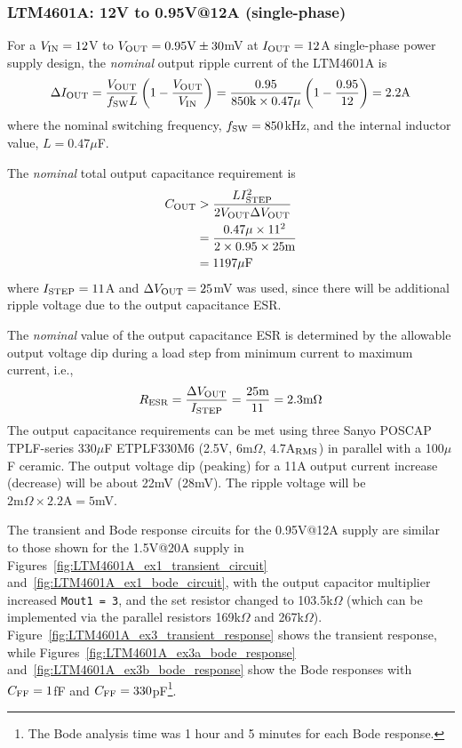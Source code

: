 \clearpage
\subsubsection{LTM4601A: 12V to 0.95V@12A (single-phase)}

For a $V_{\rm IN} = 12$V to $V_{\rm OUT} = 0.95\text{V} \pm 30$mV at 
$I_{\rm OUT} = 12$A single-phase power supply design, the
{\em nominal} output ripple current of the LTM4601A is
%
\begin{equation}
\Delta I_{\rm OUT} = \frac{V_{\rm OUT}}{f_{\rm SW}L}\left(
1 - \frac{V_{\rm OUT}}{V_{\rm IN}}\right) =
\frac{0.95}{850\text{k}\times0.47\mu}\left(
1 - \frac{0.95}{12}\right) = 2.2\text{A}
\end{equation}
%
where the nominal switching frequency, $f_{\rm SW} = 850$kHz, and
the internal inductor value, $L = 0.47\mu$F.

The {\em nominal} total output capacitance requirement is
%
\begin{equation}
\begin{split}
C_{\rm OUT} &> \frac{LI_{\rm STEP}^2}{2V_{\rm OUT}\Delta V_{\rm OUT}}\\
&= \frac{0.47\mu\times 11^2}{2\times0.95\times25\text{m}}\\
&= 1197\mu\text{F}
\end{split}
\end{equation}
%
%
where $I_{\rm STEP}=11$A and $\Delta V_{\rm OUT} = 25$mV was
used, since there will be additional ripple voltage due to 
the output capacitance ESR.

The {\em nominal} value of the output capacitance ESR is determined by
the allowable output voltage dip during a load step from minimum current
to maximum current, i.e.,
%
\begin{equation}
R_{\rm ESR} = \frac{\Delta V_{\rm OUT}}{I_{\rm STEP}} = 
\frac{25\text{m}}{11} = 2.3\text{m}\Omega
\end{equation}
%
The output capacitance requirements can be met using three
Sanyo POSCAP TPLF-series
330$\mu$F ETPLF330M6 (2.5V, 6m$\Omega$, 4.7A$_{\rm RMS}$)
in parallel with a 100$\mu$F ceramic.
%
The output voltage dip (peaking) for a 11A output current increase
(decrease) will be about 22mV (28mV). The ripple voltage will
be $2\text{m}\Omega \times 2.2\text{A} = 5$mV.

The transient and Bode response circuits for the 0.95V@12A supply
are similar to those shown for the 1.5V@20A supply in 
Figures~\ref{fig:LTM4601A_ex1_transient_circuit}
and~\ref{fig:LTM4601A_ex1_bode_circuit}, with the
output capacitor multiplier increased \verb+Mout1 = 3+,
and the set resistor changed to 103.5k$\Omega$
(which can be implemented via the parallel resistors
169k$\Omega$ and 267k$\Omega$).
Figure~\ref{fig:LTM4601A_ex3_transient_response} shows the
transient response, while
Figures~\ref{fig:LTM4601A_ex3a_bode_response}
and~\ref{fig:LTM4601A_ex3b_bode_response}
show the Bode responses with $C_{\rm FF} = 1$fF and
$C_{\rm FF} = 330$pF\footnote{The Bode analysis time
was 1 hour and 5 minutes for each Bode response.}.

